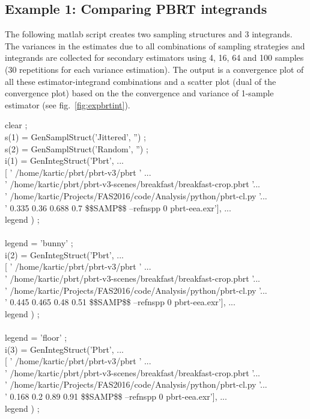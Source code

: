 \subsection{Example 1: Comparing PBRT integrands}\label{sec:expbrtint}
The following matlab script creates two sampling structures and 3 integrands. The variances in the estimates due to all combinations of sampling strategies and integrands are collected for secondary estimators using 4, 16, 64 and 100 samples (30 repetitions for each variance estimation). The output is a convergence plot of all these estimator-integrand combinations and a scatter plot (dual of the convergence plot) based on the the convergence and variance of 1-sample estimator (see fig.~\ref{fig:expbrtint}). 
\begin{tcolorbox}
clear ;\\
s(1) = GenSamplStruct('Jittered', '') ;\\
s(2) = GenSamplStruct('Random', '') ;\\
i(1) = GenIntegStruct('Pbrt', ...\\
            {[ ' /home/kartic/pbrt/pbrt-v3/pbrt ' ...\\
            ' /home/kartic/pbrt/pbrt-v3-scenes/breakfast/breakfast-crop.pbrt '...\\
            ' /home/kartic/Projects/FAS2016/code/Analysis/python/pbrt-cl.py '...\\
            ' 0.335 0.36 0.688 0.7  \$\$SAMP\$\$ --refnspp 0  pbrt-eea.exr']}, ...\\
            legend ) ;\\
\\
legend = 'bunny' ;\\
i(2) = GenIntegStruct('Pbrt', ...\\
            {[ ' /home/kartic/pbrt/pbrt-v3/pbrt ' ...\\
            ' /home/kartic/pbrt/pbrt-v3-scenes/breakfast/breakfast-crop.pbrt '...\\
            ' /home/kartic/Projects/FAS2016/code/Analysis/python/pbrt-cl.py '...\\
            ' 0.445 0.465 0.48 0.51  \$\$SAMP\$\$ --refnspp 0  pbrt-eea.exr']}, ...\\
            legend ) ;\\
\\
legend = 'floor' ;\\
i(3) = GenIntegStruct('Pbrt', ...\\
            {[ ' /home/kartic/pbrt/pbrt-v3/pbrt ' ...\\
            ' /home/kartic/pbrt/pbrt-v3-scenes/breakfast/breakfast-crop.pbrt '...\\
            ' /home/kartic/Projects/FAS2016/code/Analysis/python/pbrt-cl.py '...\\
            ' 0.168 0.2 0.89 0.91  \$\$SAMP\$\$ --refnspp 0  pbrt-eea.exr']}, ...\\
            legend ) ;\\



\end{tcolorbox}
